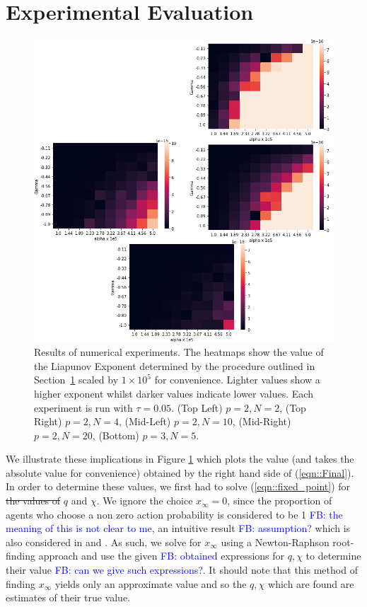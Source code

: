 \documentclass[sigconf]{aamas}
\newcommand{\xfixed}{x_\infty}
\newcommand\fb[1]{\textcolor{blue}{FB: #1}}
\begin{document}

\section{Experimental Evaluation} \label{sec:exev}

\begin{figure}
    \centering
    \includegraphics[width = 1.1 \linewidth]{Figures/Theory.png}
    \caption{Results of numerical experiments. The heatmaps show the value of the Liapunov Exponent determined by the procedure outlined in Section~\ref{sec:exev} scaled by $1 \times 10^5$ for convenience. Lighter values show a higher exponent whilst darker values indicate lower values. Each experiment is run with $\tau = 0.05$. (Top Left) $p = 2, N = 2$, (Top Right) $p = 2, N = 4$, (Mid-Left) $p = 2, N = 10$, (Mid-Right) $p = 2, N = 20$, (Bottom) $p = 3, N = 5$.}
    \label{fig:theory}
\end{figure}

We illustrate these implications in Figure \ref{fig:theory} which plots the value (and takes the absolute value for convenience) obtained by the right hand side of (\ref{eqn::Final}). In order to determine these values, we first had to solve (\ref{eqn::fixed_point}) for \st{the values of} $q$ and $\chi$. We ignore the choice $\xfixed  = 0$, since the proportion of agents who choose a non zero action probability is considered to be 1 \fb{the meaning of this is not clear to me}, an intuitive result \fb{assumption?} which is also considered in \cite{Sanders2018} and \cite{Coolen2005}. As such, we solve for $\xfixed$ using a Newton-Raphson root-finding approach and use the given \fb{obtained} expressions for $q, \chi$ to determine their value \fb{can we give such expressions?}. It should note that this method of finding $\xfixed$ yields only an approximate value and so the $q, \chi$ which are found are estimates of their true value. 
\end{document}

